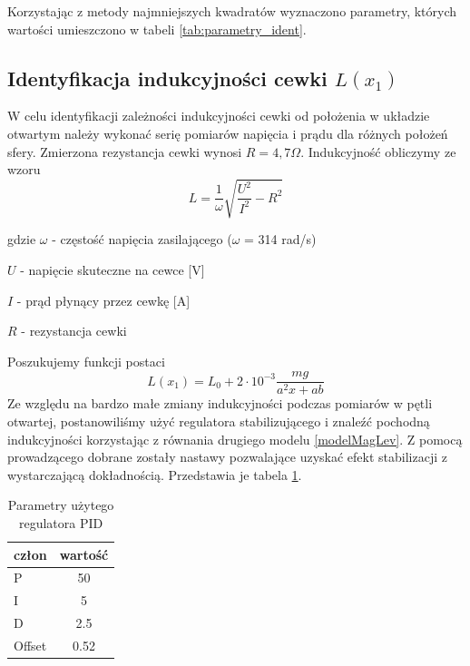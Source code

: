 Korzystając z metody najmniejszych kwadratów wyznaczono parametry, których wartości umieszczono w tabeli  \ref{tab:parametry_ident}.



\subsection{Identyfikacja indukcyjności cewki $L(x_1)$}

W celu identyfikacji zależności indukcyjności cewki od położenia w układzie otwartym należy wykonać serię pomiarów napięcia i prądu dla różnych położeń sfery. Zmierzona rezystancja cewki wynosi $R = 4,7\Omega$. Indukcyjność obliczymy ze wzoru
\begin{equation}
L = \dfrac{1}{\omega}\sqrt{\dfrac{U^2}{I^2} - R^2}
\end{equation}

gdzie
$\omega$ - częstość napięcia zasilającego ($\omega$ = 314 rad/s)

$U$ - napięcie skuteczne na cewce [V]

$I$ - prąd płynący przez cewkę [A]

$R$ - rezystancja cewki


Poszukujemy funkcji postaci
\begin{equation}
L(x_1) = L_0 + 2 \cdot 10^{-3} \dfrac{mg}{a^2x + ab}
\end{equation}
Ze względu na bardzo małe zmiany indukcyjności podczas pomiarów w pętli otwartej, postanowiliśmy użyć regulatora stabilizującego i znaleźć pochodną indukcyjności korzystając z równania drugiego modelu \ref{modelMagLev}.
Z pomocą prowadzącego dobrane zostały nastawy pozwalające uzyskać efekt stabilizacji z wystarczającą dokładnością. Przedstawia je tabela \ref{tab:parametryPID}.

\begin{table}[ht]
\begin{center}
  \begin{tabular}{| l | c | }
    \hline
    człon & wartość \\ \hline
    P 		& 50 \\ \hline
    I 		& 5 \\ \hline
    D 		& 2.5 \\ \hline
    Offset 	& 0.52 \\
    \hline

  \end{tabular}
  \caption{Parametry użytego regulatora PID}
  \label{tab:parametryPID}
\end{center}
\end{table}

